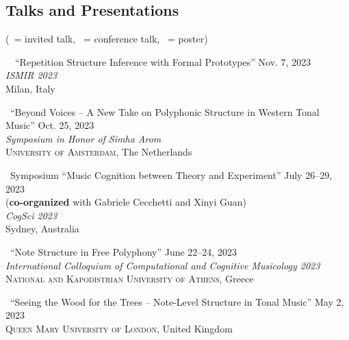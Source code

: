 \documentclass[10pt]{scrartcl}
\newcommand{\margintext}[1]{\marginpar{\raggedleft\small#1}}
\newcommand{\entry}[1]{\vphantom{x}\margintext{#1}}
\begin{document}

\entry{2020}%



\entry{2019}%

\entry{2018}%

\subsection*{Talks and Presentations}

\newcommand{\invited}[0]{\faCommentO\ }
\newcommand{\contrib}[0]{\faCommentsO\ }
\newcommand{\poster}[0]{\faFileO\ }
\newcommand{\talkdate}[1]{\hfill #1}

(\invited = invited talk, \contrib = conference talk, \poster = poster)

\entry{2023}%
\contrib \poster \enquote{Repetition Structure Inference with Formal Prototypes}
\talkdate{Nov. 7, 2023}\\
\textit{ISMIR 2023}\\
Milan, Italy

\invited \enquote{Beyond Voices -- A New Take on Polyphonic Structure in Western Tonal Music}
\talkdate{Oct. 25, 2023}\\
\textit{Symposium in Honor of Simha Arom}\\
\textsc{University of Amsterdam}, The Netherlands

\contrib Symposium \enquote{Music Cognition between Theory and Experiment}
\talkdate{July 26--29, 2023}\\
(\textbf{co-organized} with Gabriele Cecchetti and Xinyi Guan)\\
\textit{CogSci 2023}\\
Sydney, Australia

\poster \enquote{Note Structure in Free Polyphony}
\talkdate{June 22--24, 2023}\\
\textit{International Colloquium of Computational and Cognitive Musicology 2023}\\
\textsc{National and Kapodistrian University of Athens}, Greece

\invited \enquote{Seeing the Wood for the Trees -- Note-Level Structure in Tonal Music}
\talkdate{May 2, 2023}\\
\textsc{Queen Mary University of London}, United Kingdom
\end{document}
